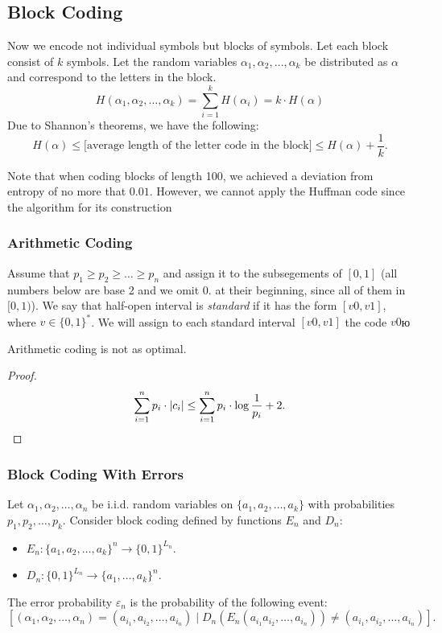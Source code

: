 \subsection{Block Coding}

Now we encode not individual symbols but blocks of symbols.
Let each block consist of $k$ symbols.
Let the random variables $\alpha_{1}, \alpha_{2}, \dots, \alpha_{k}$ be distributed as $\alpha$ and correspond to the letters in the block.
\[
H(\alpha_{1}, \alpha_{2}, \dots, \alpha_{k}) = \sum_{i = 1}^{k} H(\alpha_{i}) = k \cdot H(\alpha)
\]
Due to Shannon's theorems, we have the following:
\[
H(\alpha) \le \text{[average length of the letter code in the block]} \le H(\alpha) + \frac{1}{k}.
\]

Note that when coding blocks of length 100, we achieved a deviation from entropy of no more that $0.01$. However, we cannot apply the Huffman code since the algorithm for its construction 

\subsubsection{Arithmetic Coding}


\begin{definition}
    Assume that $p_{1} \ge p_{2} \ge \dots \ge p_{n}$ and assign it to the subsegements of $[0, 1]$ (all numbers below are base 2 and we omit $0.$ at their beginning, since all of them in $[0, 1)$).
    We say that half-open interval is \emph{standard} if it has the form $[v 0, v 1]$, where $v \in \{ 0, 1 \}^{\ast}$.
    We will assign to each standard interval $[v 0, v1]$ the code $v0$ю
\end{definition}

\begin{statement}
    Arithmetic coding is not as optimal.
\end{statement}
\begin{proof}
    \[\sum _{ i = 1 }^{ n } p_{i} \cdot |c_{i}| \le \sum _{ i = 1 }^{ n } p_{i} \cdot \log \frac{1}{p_{i}} + 2. \qedhere \]
\end{proof}

\subsubsection{Block Coding With Errors}

Let $\alpha_{1}, \alpha_{2}, \dots, \alpha_{n}$ be i.i.d. random variables on $\{ a_{1}, a_{2}, \dots, a_{k} \}$ with probabilities $p_{1}, p_{2}, \dots, p_{k}$.
Consider block coding defined by functions $E_{n}$ and $D_{n}$:
\begin{itemize}
    \item $E_{n}: \{ a_{1}, a_{2}, \dots, a_{k} \}^{n} \to \{ 0, 1 \}^{L_{n}}$.
    \item $D_{n}: \{ 0, 1 \}^{L_{n}} \to \{ a_{1}, \dots, a_{k} \}^{n}$.
\end{itemize}

The error probability $\varepsilon_{n}$ is the probability of the following event:
\[
\left[ (\alpha_{1}, \alpha_{2}, \dots, \alpha_{n}) = (a_{i_{1}}, a_{i_{2}}, \dots, a_{i_{n}}) \mid D_{n}(E_{n}(a_{i_{1}}a_{i_{2}}, \dots, a_{i_{n}})) \ne (a_{i_{1}}, a_{i_{2}}, \dots, a_{i_{n}}) \right].
\]


